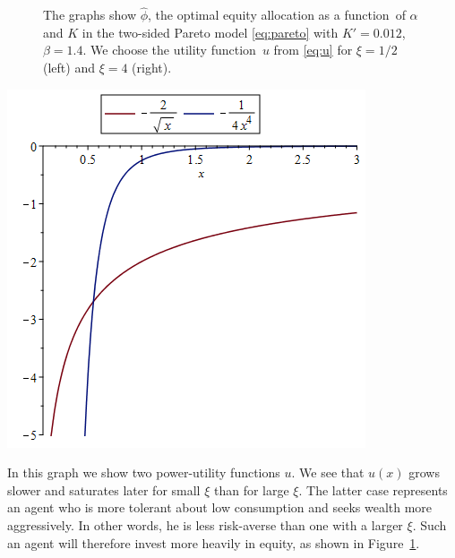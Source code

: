 \documentclass[11pt,a4]{amsart}
\newcommand{\fct}{function}
\newcommand{\1}{{\mathbf 1}}
\begin{document}
\begin{figure}[htb!]
\begin{minipage}{0.5\linewidth}
  \end{minipage}
 \caption{The graphs show $\hat\phi$, the optimal equity allocation
    as a \fct\ of $\alpha$ and $K$ in the two-sided Pareto model
    \eqref{eq:pareto} with $K'=0.012$, $\beta = 1.4$. We choose
    the utility \fct\ $u$ from \eqref{eq:u}
    for $\xi = 1/2$ (left) and $\xi = 4$
    (right).
  }
  \label{fig:phi_hat_pareto}
\end{figure}

\begin{minipage}{0.5\linewidth}
  \includegraphics[width=\textwidth]{power_utilities.png}
\end{minipage}\hfill
\begin{minipage}{0.42\textwidth}
  In this graph we show two power-utility functions $u$. We see that
  $u(x)$ grows slower and saturates later for small $\xi$ than for
  large $\xi$. The latter case represents an agent who is more
  tolerant about low consumption and seeks wealth more
  aggressively. In other words, he is less risk-averse than one with a
  larger $\xi$. Such an agent will therefore invest more heavily in
  equity, as shown in Figure~\ref{fig:phi_hat_pareto}.
\end{minipage}
\end{document}
